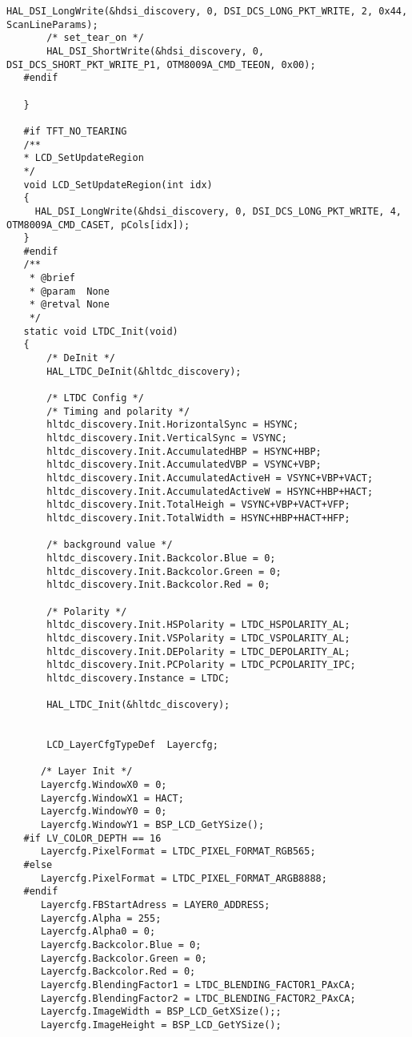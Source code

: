 \begin{lstlisting}[captionpos=t, caption={Fichero \texttt{tft.c}}]
       HAL_DSI_LongWrite(&hdsi_discovery, 0, DSI_DCS_LONG_PKT_WRITE, 2, 0x44, ScanLineParams);
       /* set_tear_on */
       HAL_DSI_ShortWrite(&hdsi_discovery, 0, DSI_DCS_SHORT_PKT_WRITE_P1, OTM8009A_CMD_TEEON, 0x00);
   #endif
   
   }
   
   #if TFT_NO_TEARING
   /**
   * LCD_SetUpdateRegion
   */
   void LCD_SetUpdateRegion(int idx)
   {
     HAL_DSI_LongWrite(&hdsi_discovery, 0, DSI_DCS_LONG_PKT_WRITE, 4, OTM8009A_CMD_CASET, pCols[idx]);
   }
   #endif
   /**
    * @brief
    * @param  None
    * @retval None
    */
   static void LTDC_Init(void)
   {
       /* DeInit */
       HAL_LTDC_DeInit(&hltdc_discovery);
   
       /* LTDC Config */
       /* Timing and polarity */
       hltdc_discovery.Init.HorizontalSync = HSYNC;
       hltdc_discovery.Init.VerticalSync = VSYNC;
       hltdc_discovery.Init.AccumulatedHBP = HSYNC+HBP;
       hltdc_discovery.Init.AccumulatedVBP = VSYNC+VBP;
       hltdc_discovery.Init.AccumulatedActiveH = VSYNC+VBP+VACT;
       hltdc_discovery.Init.AccumulatedActiveW = HSYNC+HBP+HACT;
       hltdc_discovery.Init.TotalHeigh = VSYNC+VBP+VACT+VFP;
       hltdc_discovery.Init.TotalWidth = HSYNC+HBP+HACT+HFP;
   
       /* background value */
       hltdc_discovery.Init.Backcolor.Blue = 0;
       hltdc_discovery.Init.Backcolor.Green = 0;
       hltdc_discovery.Init.Backcolor.Red = 0;
   
       /* Polarity */
       hltdc_discovery.Init.HSPolarity = LTDC_HSPOLARITY_AL;
       hltdc_discovery.Init.VSPolarity = LTDC_VSPOLARITY_AL;
       hltdc_discovery.Init.DEPolarity = LTDC_DEPOLARITY_AL;
       hltdc_discovery.Init.PCPolarity = LTDC_PCPOLARITY_IPC;
       hltdc_discovery.Instance = LTDC;
   
       HAL_LTDC_Init(&hltdc_discovery);
   
   
       LCD_LayerCfgTypeDef  Layercfg;
   
      /* Layer Init */
      Layercfg.WindowX0 = 0;
      Layercfg.WindowX1 = HACT;
      Layercfg.WindowY0 = 0;
      Layercfg.WindowY1 = BSP_LCD_GetYSize();
   #if LV_COLOR_DEPTH == 16
      Layercfg.PixelFormat = LTDC_PIXEL_FORMAT_RGB565;
   #else
      Layercfg.PixelFormat = LTDC_PIXEL_FORMAT_ARGB8888;
   #endif
      Layercfg.FBStartAdress = LAYER0_ADDRESS;
      Layercfg.Alpha = 255;
      Layercfg.Alpha0 = 0;
      Layercfg.Backcolor.Blue = 0;
      Layercfg.Backcolor.Green = 0;
      Layercfg.Backcolor.Red = 0;
      Layercfg.BlendingFactor1 = LTDC_BLENDING_FACTOR1_PAxCA;
      Layercfg.BlendingFactor2 = LTDC_BLENDING_FACTOR2_PAxCA;
      Layercfg.ImageWidth = BSP_LCD_GetXSize();;
      Layercfg.ImageHeight = BSP_LCD_GetYSize();
   

\end{lstlisting}
